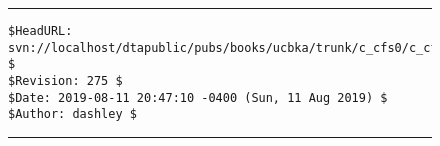 \vfill
\noindent\begin{figure}[!b]
\noindent\rule[-0.25in]{\textwidth}{1pt}
\begin{tiny}
\begin{verbatim}
$HeadURL: svn://localhost/dtapublic/pubs/books/ucbka/trunk/c_cfs0/c_cfs0.tex $
$Revision: 275 $
$Date: 2019-08-11 20:47:10 -0400 (Sun, 11 Aug 2019) $
$Author: dashley $
\end{verbatim}
\end{tiny}
\noindent\rule[0.25in]{\textwidth}{1pt}
\end{figure}

%
